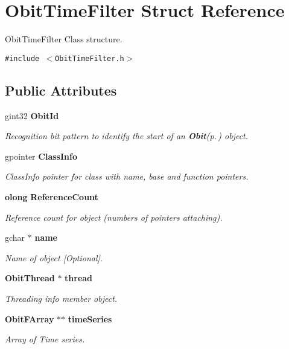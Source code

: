 \section{Obit\-Time\-Filter Struct Reference}
\label{structObitTimeFilter}
Obit\-Time\-Filter Class structure.  


{\tt \#include $<$Obit\-Time\-Filter.h$>$}

\subsection*{Public Attributes}
\begin{CompactItemize}
\item 
gint32 {\bf Obit\-Id}
\begin{CompactList}\small\item\em Recognition bit pattern to identify the start of an {\bf Obit}{\rm (p.\,\pageref{structObit})} object. \item\end{CompactList}\item 
gpointer {\bf Class\-Info}
\begin{CompactList}\small\item\em Class\-Info pointer for class with name, base and function pointers. \item\end{CompactList}\item 
{\bf olong} {\bf Reference\-Count}
\begin{CompactList}\small\item\em Reference count for object (numbers of pointers attaching). \item\end{CompactList}\item 
gchar $\ast$ {\bf name}
\begin{CompactList}\small\item\em Name of object [Optional]. \item\end{CompactList}\item 
{\bf Obit\-Thread} $\ast$ {\bf thread}
\begin{CompactList}\small\item\em Threading info member object. \item\end{CompactList}\item 
{\bf Obit\-FArray} $\ast$$\ast$ {\bf time\-Series}
\begin{CompactList}\small\item\em Array of Time series. \item\end{CompactList}\item 
$$
\end{CompactItemize}
